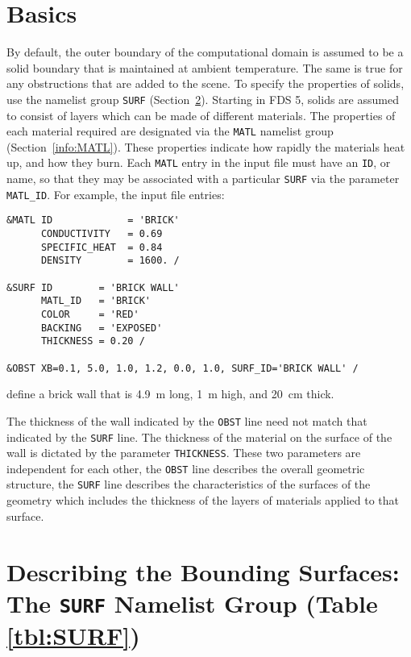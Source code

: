 \documentclass[11pt]{book}
\newcommand{\ct}{\tt\small}
\begin{document}
\section{Basics}

By default, the outer boundary of the computational domain is assumed
to be a solid boundary that is maintained at ambient temperature. The
same is true for any obstructions that are added to the scene. To
specify the properties of solids, use the namelist group {\ct SURF}
(Section~\ref{info:SURF}). Starting in FDS 5, solids are assumed to
consist of layers which can be made of different materials.  The
properties of each material required are designated via the {\ct MATL}
namelist group (Section~\ref{info:MATL}).  These properties indicate how
rapidly the materials heat up, and how they burn.  Each {\ct MATL}
entry in the input file must have an {\ct ID}, or name, so that they
may be associated with a particular {\ct SURF} via the parameter {\ct
MATL\_ID}.  For example, the input file entries:

\footnotesize
\begin{verbatim}
&MATL ID             = 'BRICK'
      CONDUCTIVITY   = 0.69
      SPECIFIC_HEAT  = 0.84
      DENSITY        = 1600. /

&SURF ID        = 'BRICK WALL'
      MATL_ID   = 'BRICK'
      COLOR     = 'RED'
      BACKING   = 'EXPOSED'
      THICKNESS = 0.20 /

&OBST XB=0.1, 5.0, 1.0, 1.2, 0.0, 1.0, SURF_ID='BRICK WALL' /
\end{verbatim}
\normalsize

\noindent
define a brick wall that is 4.9~m long, 1~m high, and 20~cm thick.
\begin{warning}
\noindent
The thickness of the wall indicated by the {\ct OBST} line need not
match that indicated by the {\ct SURF} line. The thickness of the material on the surface of the wall
is dictated by the parameter {\ct THICKNESS}.  These two parameters are independent for each other,
the {\ct OBST} line describes the overall geometric structure, the {\ct SURF} line describes the
characteristics of the surfaces of the geometry which includes the thickness of the layers of
materials applied to that surface.
\end{warning}


\section{Describing the Bounding Surfaces: The \texorpdfstring{{\tt SURF}}{SURF} Namelist Group (Table \ref{tbl:SURF})}
\label{info:SURF}
\end{document}

